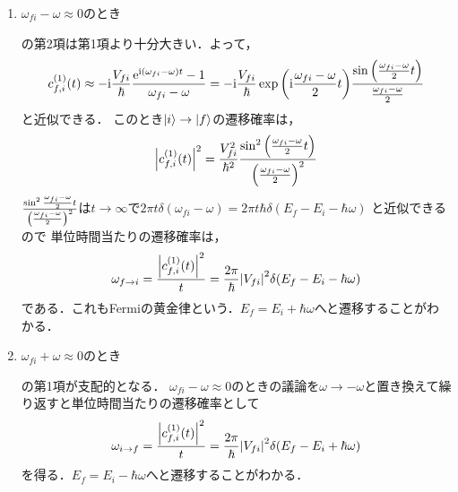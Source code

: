 \documentclass{report}
\begin{document}
  \begin{enumerate}
    \item $\omega_{fi} - \omega \approx 0$のとき\par
      の第2項は第1項より十分大きい．よって，
      \begin{align}
        c_{f, i}^{(1)}(t)\approx -\mathrm{i}\frac{V_{fi}}{\hbar}\frac{\mathrm{e}^{\mathrm{i}(\omega_{fi} - \omega)t} - 1}{\omega_{fi} - \omega} = -\mathrm{i}\frac{V_{fi}}{\hbar}\exp\qty(\mathrm{i}\frac{\omega_{fi} - \omega}{2}t)\frac{\sin\qty(\frac{\omega_{fi} - \omega}{2}t)}{\frac{\omega_{fi} - \omega}{2}}
      \end{align}
      と近似できる．
      このとき$\ket{i}\to\ket{f}$の遷移確率は，
      \begin{align}
        \abs{c_{f, i}^{(1)}(t)}^2 = \frac{V_{fi}^2}{\hbar^2}\frac{\sin^2\qty(\frac{\omega_{fi} - \omega}{2}t)}{\qty(\frac{\omega_{fi} - \omega}{2})^2}
      \end{align}
      $\frac{\sin^2\frac{\omega_{fi} - \omega}{2}t}{\qty(\frac{\omega_{fi} - \omega}{2})^2}$は$t\to\infty$で$2\pi t\delta(\omega_{fi} - \omega) = 2\pi t\hbar\delta(E_f - E_i - \hbar\omega)$
      と近似できるので
      単位時間当たりの遷移確率は，
      \begin{align}
        \omega_{f\to i} = \frac{\abs{c_{f, i}^{(1)}(t)}^2}{t} = \frac{2\pi}{\hbar}\abs{V_{fi}}^2\delta(E_f - E_i - \hbar\omega)
      \end{align}
      である．これもFermiの黄金律という．$E_f = E_i + \hbar\omega$へと遷移することがわかる．
    \item $\omega_{fi} + \omega\approx 0$のとき\par
      の第1項が支配的となる．
      $\omega_{fi} - \omega \approx 0$のときの議論を$\omega\to-\omega$と置き換えて繰り返すと単位時間当たりの遷移確率として
      \begin{align}
        \omega_{i\to f} = \frac{\abs{c_{f,i}^{(1)}(t)}^2}{t} = \frac{2\pi}{\hbar}\abs{V_{fi}}^2\delta(E_f - E_i + \hbar\omega)
      \end{align}
      を得る．$E_f = E_i - \hbar\omega$へと遷移することがわかる．
  \end{enumerate}
\end{document}
